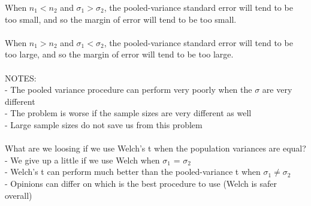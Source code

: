 \documentclass[12pt, a4paper]{article}
\begin{document}
	When $n_1 < n_2$ and $\sigma_1 > \sigma_2$, the pooled-variance standard error will tend to be too small, and so the margin of error will tend to be too small. \\~\\
	When $n_1 > n_2$ and $\sigma_1 < \sigma_2$, the pooled-variance standard error will tend to be too large, and so the margin of error will tend to be too large. \\~\\
	NOTES: \\
	- The pooled variance procedure can perform very poorly when the $\sigma$ are very different \\
	- The problem is worse if the sample sizes are very different as well \\
	- Large sample sizes do not save us from this problem \\~\\
	What are we loosing if we use Welch's t when the population variances are equal?  \\
	- We give up a little if we use Welch when $\sigma_1$ = $\sigma_2$ \\
	- Welch's t can perform much better than the pooled-variance t when $\sigma_1 \neq \sigma_2$ \\
	- Opinions can differ on which is the best procedure to use (Welch is safer overall) \newpage
	
\end{document}
